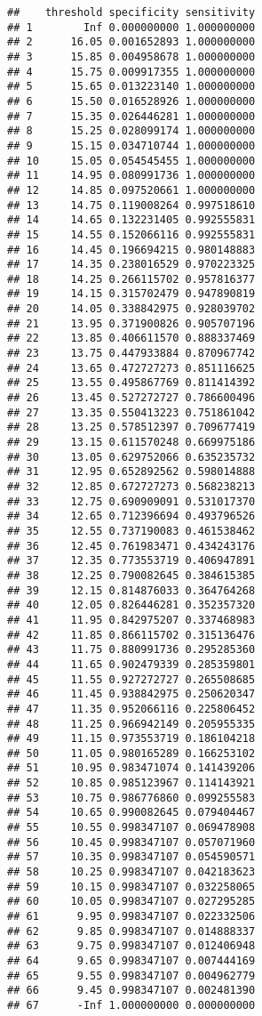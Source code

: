 \documentclass[
]{article}
\begin{document}
\begin{verbatim}
##    threshold specificity sensitivity
## 1        Inf 0.000000000 1.000000000
## 2      16.05 0.001652893 1.000000000
## 3      15.85 0.004958678 1.000000000
## 4      15.75 0.009917355 1.000000000
## 5      15.65 0.013223140 1.000000000
## 6      15.50 0.016528926 1.000000000
## 7      15.35 0.026446281 1.000000000
## 8      15.25 0.028099174 1.000000000
## 9      15.15 0.034710744 1.000000000
## 10     15.05 0.054545455 1.000000000
## 11     14.95 0.080991736 1.000000000
## 12     14.85 0.097520661 1.000000000
## 13     14.75 0.119008264 0.997518610
## 14     14.65 0.132231405 0.992555831
## 15     14.55 0.152066116 0.992555831
## 16     14.45 0.196694215 0.980148883
## 17     14.35 0.238016529 0.970223325
## 18     14.25 0.266115702 0.957816377
## 19     14.15 0.315702479 0.947890819
## 20     14.05 0.338842975 0.928039702
## 21     13.95 0.371900826 0.905707196
## 22     13.85 0.406611570 0.888337469
## 23     13.75 0.447933884 0.870967742
## 24     13.65 0.472727273 0.851116625
## 25     13.55 0.495867769 0.811414392
## 26     13.45 0.527272727 0.786600496
## 27     13.35 0.550413223 0.751861042
## 28     13.25 0.578512397 0.709677419
## 29     13.15 0.611570248 0.669975186
## 30     13.05 0.629752066 0.635235732
## 31     12.95 0.652892562 0.598014888
## 32     12.85 0.672727273 0.568238213
## 33     12.75 0.690909091 0.531017370
## 34     12.65 0.712396694 0.493796526
## 35     12.55 0.737190083 0.461538462
## 36     12.45 0.761983471 0.434243176
## 37     12.35 0.773553719 0.406947891
## 38     12.25 0.790082645 0.384615385
## 39     12.15 0.814876033 0.364764268
## 40     12.05 0.826446281 0.352357320
## 41     11.95 0.842975207 0.337468983
## 42     11.85 0.866115702 0.315136476
## 43     11.75 0.880991736 0.295285360
## 44     11.65 0.902479339 0.285359801
## 45     11.55 0.927272727 0.265508685
## 46     11.45 0.938842975 0.250620347
## 47     11.35 0.952066116 0.225806452
## 48     11.25 0.966942149 0.205955335
## 49     11.15 0.973553719 0.186104218
## 50     11.05 0.980165289 0.166253102
## 51     10.95 0.983471074 0.141439206
## 52     10.85 0.985123967 0.114143921
## 53     10.75 0.986776860 0.099255583
## 54     10.65 0.990082645 0.079404467
## 55     10.55 0.998347107 0.069478908
## 56     10.45 0.998347107 0.057071960
## 57     10.35 0.998347107 0.054590571
## 58     10.25 0.998347107 0.042183623
## 59     10.15 0.998347107 0.032258065
## 60     10.05 0.998347107 0.027295285
## 61      9.95 0.998347107 0.022332506
## 62      9.85 0.998347107 0.014888337
## 63      9.75 0.998347107 0.012406948
## 64      9.65 0.998347107 0.007444169
## 65      9.55 0.998347107 0.004962779
## 66      9.45 0.998347107 0.002481390
## 67      -Inf 1.000000000 0.000000000
\end{verbatim}
\end{document}
